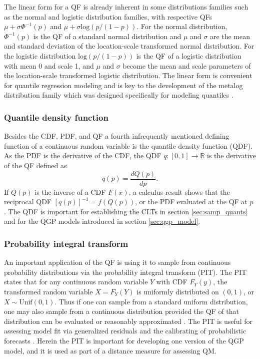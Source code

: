 \documentclass[preprint,12pt,authoryear]{elsarticle}
\begin{document}
The linear form for a QF is already inherent in some distributions families such as the normal and logistic distribution families, with respective QFs $\mu + \sigma \Phi^{-1} (p)$ and $\mu + \sigma \text{log}(p/(1 - p))$. For the normal distribution, $\Phi^{-1}(p)$ is the QF of a standard normal distribution and $\mu$ and $\sigma$ are the mean and standard deviation of the location-scale transformed normal distribution. For the logistic distribution $\text{log}(p/(1-p))$ is the QF of a logistic distribution with mean 0 and scale 1, and $\mu$ and $\sigma$ become the mean and scale parameters of the location-scale transformed logistic distribution. The linear form is convenient for quantile regression modeling and is key to the development of the metalog distribution family which was designed specifically for modeling quantiles \cite[]{keelin2016metalog}. 

\subsubsection{Quantile density function}

Besides the CDF, PDF, and QF a  fourth infrequently mentioned defining function of a continuous random variable is the quantile density function (QDF). As the PDF is the derivative of the CDF, the QDF $q:[0,1] \rightarrow \mathbb{R}$ is the derivative of the QF defined as
\[
    q(p) = \frac{dQ(p)}{dp}.
\]
If $Q(p)$ is the inverse of a CDF $F(x)$, a calculus result shows that the reciprocal QDF $[q(p)]^{-1} = f(Q(p))$, or the PDF evaluated at the QF at $p$ \cite[]{perepolkin2023tenets, gilchrist2000statistical}. The QDF is important for establishing the CLTs in section \ref{sec:samp_quants} and for the QGP models introduced in section \ref{sec:qgp_model}.

\subsubsection{Probability integral transform}
An important application of the QF is using it to sample from continuous probability distributions via the probability integral transform (PIT). The PIT states that for any continuous random variable $Y$ with CDF $F_Y(y)$, the transformed random variable $X = F_Y(Y)$ is uniformly distributed on $(0,1)$, or $X \sim \text{Unif}(0,1)$. Thus if one can sample from a standard uniform distribution, one may also sample from a continuous distribution provided the QF of that distribution can be evaluated or reasonably approximated \cite[]{wilkinson2018stochastic}. The PIT is useful for assessing model fit via generalized residuals \cite[]{yang2024double, cox1968general} and the calibrating of probabilistic forecasts \cite[]{gneiting2007probabilistic}. Herein the PIT is important for developing one version of the QGP model, and it is used as part of a distance measure for assessing QM.
\end{document}
